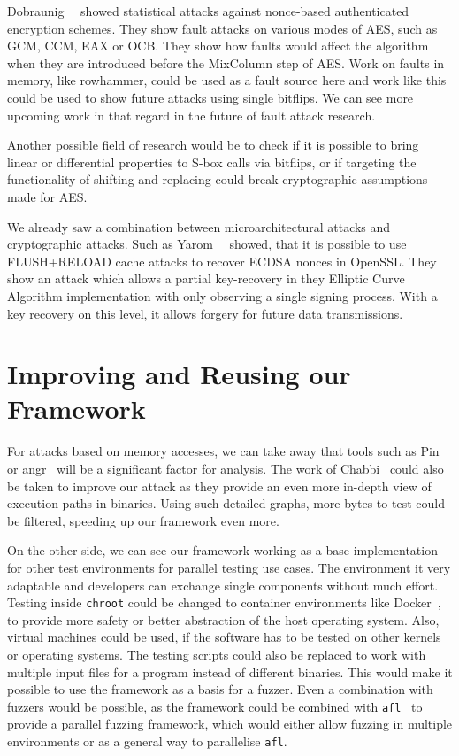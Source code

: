 Dobraunig~\etal~\cite{noncestat} showed statistical attacks against nonce-based
authenticated encryption schemes. They show fault attacks on various modes of
AES, such as GCM, CCM, EAX or OCB. They show how faults would affect the
algorithm when they are introduced before the MixColumn step of AES. Work on
faults in memory, like rowhammer, could be used as a fault source here and work
like this could be used to show future attacks using single bitflips. We can see
more upcoming work in that regard in the future of fault attack research.

Another possible field of research would be to check if it is possible to bring
linear or differential properties to S-box calls via bitflips, or if targeting
the functionality of shifting and replacing could break cryptographic
assumptions made for AES.

We already saw a combination between microarchitectural attacks and
cryptographic attacks. Such as Yarom~\etal~\cite{noncerec} showed, that it is
possible to use FLUSH+RELOAD cache attacks to recover ECDSA nonces in OpenSSL.
They show an attack which allows a partial key-recovery in they Elliptic Curve
Algorithm implementation with only observing a single signing process. With a
key recovery on this level, it allows forgery for future data transmissions.

\section{Improving and Reusing our Framework}

For attacks based on memory accesses, we can take away that tools such as
Pin~\cite{pintool} or angr~\cite{angrpaper} will be a significant factor for
analysis. The work of Chabbi~\etal\cite{pincallpaths} could also be taken to
improve our attack as they provide an even more in-depth view of execution paths
in binaries. Using such detailed graphs, more bytes to test could be filtered,
speeding up our framework even more.

On the other side, we can see our framework working as a base implementation for
other test environments for parallel testing use cases. The environment it very
adaptable and developers can exchange single components without much effort.
Testing inside \texttt{chroot} could be changed to container environments like
Docker~\cite{docker}, to provide more safety or better abstraction of the host
operating system. Also, virtual machines could be used, if the software has to
be tested on other kernels or operating systems. The testing scripts could also
be replaced to work with multiple input files for a program instead of different
binaries. This would make it possible to use the framework as a basis for a
fuzzer. Even a combination with fuzzers would be possible, as the framework
could be combined with \texttt{afl}~\cite{aflweb} to provide a parallel fuzzing
framework, which would either allow fuzzing in multiple environments or as a
general way to parallelise \texttt{afl}.

